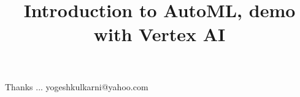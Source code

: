 \documentclass[xcolor=dvipsnames,compress,t,pdf,9pt]{beamer}
\title[\insertframenumber /\inserttotalframenumber]{Introduction to AutoML, demo with Vertex AI}
\begin{document}
	\begin{frame}
	\titlepage
%
	\end{frame}
	
	
	
	\begin{frame}[c]{}
	Thanks ...
	\vspace{5mm}
	yogeshkulkarni@yahoo.com
	\end{frame}
\end{document}
